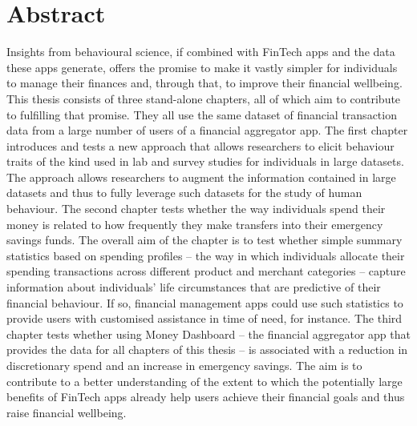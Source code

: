 
\chapter*{Abstract}%
\label{cha:abstract}

Insights from behavioural science, if combined with FinTech apps and the data
these apps generate, offers the promise to make it vastly simpler for
individuals to manage their finances and, through that, to improve their
financial wellbeing. This thesis consists of three stand-alone chapters, all of
which aim to contribute to fulfilling that promise. They all use the same
dataset of financial transaction data from a large number of users of a
financial aggregator app. The first chapter introduces and tests a new approach
that allows researchers to elicit behaviour traits of the kind used in lab and
survey studies for individuals in large datasets. The approach allows
researchers to augment the information contained in large datasets and thus to
fully leverage such datasets for the study of human behaviour. The second
chapter tests whether the way individuals spend their money is related to how
frequently they make transfers into their emergency savings funds. The overall
aim of the chapter is to test whether simple summary statistics based on
spending profiles -- the way in which individuals allocate their spending
transactions across different product and merchant categories -- capture
information about individuals' life circumstances that are predictive of their
financial behaviour. If so, financial management apps could use such statistics
to provide users with customised assistance in time of need, for instance. The
third chapter tests whether using Money Dashboard -- the financial aggregator
app that provides the data for all chapters of this thesis -- is associated
with a reduction in discretionary spend and an increase in emergency savings.
The aim is to contribute to a better understanding of the extent to which the
potentially large benefits of FinTech apps already help users achieve their
financial goals and thus raise financial wellbeing.


